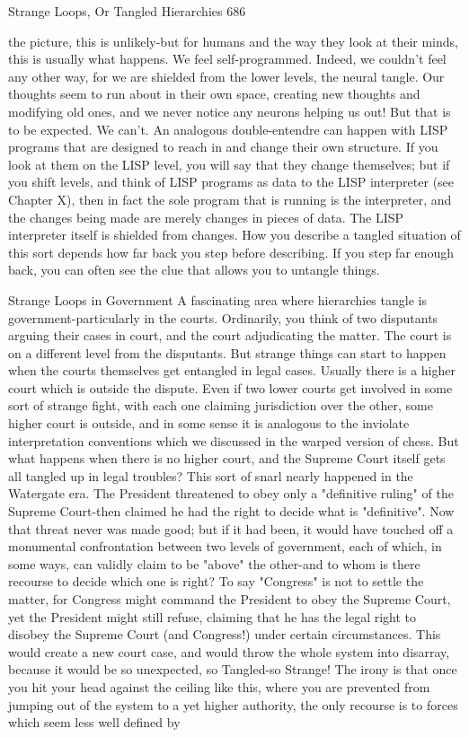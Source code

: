Strange Loops, Or Tangled Hierarchies                                                        686

the picture, this is unlikely-but for humans and the way they look at their minds, this is
usually what happens. We feel self-programmed. Indeed, we couldn't feel any other way,
for we are shielded from the lower levels, the neural tangle. Our thoughts seem to run
about in their own space, creating new thoughts and modifying old ones, and we never
notice any neurons helping us out! But that is to be expected. We can't.
        An analogous double-entendre can happen with LISP programs that are designed
to reach in and change their own structure. If you look at them on the LISP level, you
will say that they change themselves; but if you shift levels, and think of LISP programs
as data to the LISP interpreter (see Chapter X), then in fact the sole program that is
running is the interpreter, and the changes being made are merely changes in pieces of
data. The LISP interpreter itself is shielded from changes.
        How you describe a tangled situation of this sort depends how far back you step
before describing. If you step far enough back, you can often see the clue that allows you
to untangle things.

                          Strange Loops in Government
A fascinating area where hierarchies tangle is government-particularly in the courts.
Ordinarily, you think of two disputants arguing their cases in court, and the court
adjudicating the matter. The court is on a different level from the disputants. But strange
things can start to happen when the courts themselves get entangled in legal cases.
Usually there is a higher court which is outside the dispute. Even if two lower courts get
involved in some sort of strange fight, with each one claiming jurisdiction over the other,
some higher court is outside, and in some sense it is analogous to the inviolate
interpretation conventions which we discussed in the warped version of chess.
         But what happens when there is no higher court, and the Supreme Court itself gets
all tangled up in legal troubles? This sort of snarl nearly happened in the Watergate era.
The President threatened to obey only a "definitive ruling" of the Supreme Court-then
claimed he had the right to decide what is "definitive". Now that threat never was made
good; but if it had been, it would have touched off a monumental confrontation between
two levels of government, each of which, in some ways, can validly claim to be "above"
the other-and to whom is there recourse to decide which one is right? To say "Congress"
is not to settle the matter, for Congress might command the President to obey the
Supreme Court, yet the President might still refuse, claiming that he has the legal right to
disobey the Supreme Court (and Congress!) under certain circumstances. This would
create a new court case, and would throw the whole system into disarray, because it
would be so unexpected, so Tangled-so Strange!
         The irony is that once you hit your head against the ceiling like this, where you
are prevented from jumping out of the system to a yet higher authority, the only recourse
is to forces which seem less well defined by





